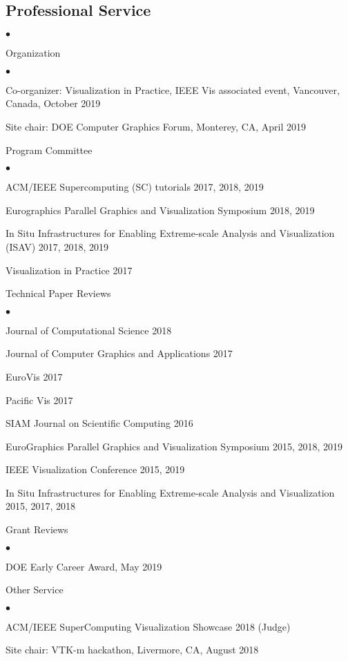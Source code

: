 \documentclass[margin,line]{res}
\newenvironment{list2}{
  \begin{list}{$\bullet$}{%
      \setlength{\itemsep}{0in}
      \setlength{\parsep}{0in} \setlength{\parskip}{0in}
      \setlength{\topsep}{0in} \setlength{\partopsep}{0in}
      \setlength{\leftmargin}{0.2in}}}{\end{list}}
\begin{document}
\begin{resume}
\section{\sc Professional Service}
\begin{list2}
	\item Organization
		\begin{list2}
			\item Co-organizer: Visualization in Practice, IEEE Vis associated event, Vancouver, Canada, October 2019
			\item Site chair: DOE Computer Graphics Forum, Monterey, CA, April 2019
		\end{list2}
	\item Program Committee
		\begin{list2}
			\item ACM/IEEE Supercomputing (SC) tutorials 2017, 2018, 2019
			\item Eurographics Parallel Graphics and Visualization Symposium 2018, 2019
			\item In Situ Infrastructures for Enabling Extreme-scale Analysis and Visualization (ISAV) 2017, 2018, 2019
		    \item Visualization in Practice 2017
		\end{list2}
	\item Technical Paper Reviews
	\begin{list2}
		\item Journal of Computational Science 2018
		\item Journal of Computer Graphics and Applications 2017
		\item EuroVis 2017
		\item Pacific Vis 2017
		\item SIAM Journal on Scientific Computing 2016
		\item EuroGraphics Parallel Graphics and Visualization Symposium 2015, 2018, 2019
		\item IEEE Visualization Conference 2015, 2019
		\item In Situ Infrastructures for Enabling Extreme-scale Analysis and Visualization  2015, 2017, 2018
	\end{list2}
	\item Grant Reviews
	\begin{list2}
		\item DOE Early Career Award, May 2019
	\end{list2}
	\item Other Service
	\begin{list2}
		\item ACM/IEEE SuperComputing Visualization Showcase 2018 (Judge)
		\item Site chair: VTK-m hackathon, Livermore, CA, August 2018
	\end{list2}
\end{list2}

\end{resume}
\end{document}
